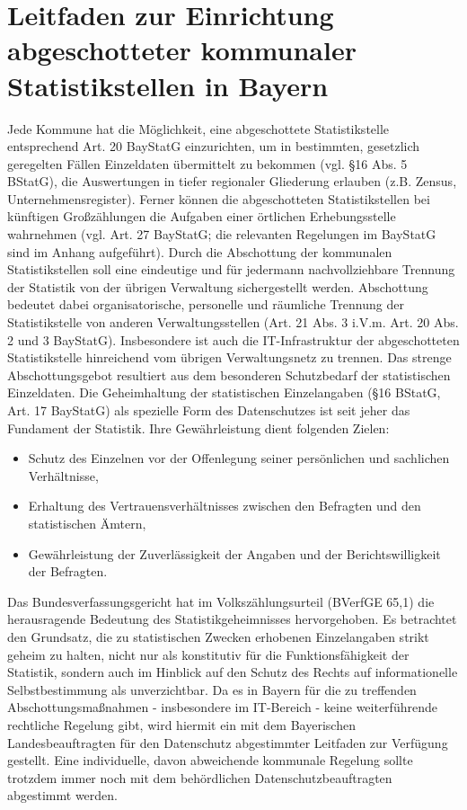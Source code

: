 \chapter[Leitfaden Abschottung]{Leitfaden zur Einrichtung abgeschotteter kommunaler Statistikstellen in Bayern}
Jede Kommune hat die Möglichkeit, eine abgeschottete Statistikstelle entsprechend Art. 20 BayStatG einzurichten, um in bestimmten, gesetzlich geregelten Fällen Einzeldaten übermittelt zu bekommen (vgl. \S 16 Abs. 5 BStatG), die Auswertungen in tiefer regionaler Gliederung erlauben (z.B. Zensus, Unternehmensregister). Ferner können die abgeschotteten Statistikstellen bei künftigen Großzählungen die Aufgaben einer örtlichen Erhebungsstelle wahrnehmen (vgl. Art. 27 BayStatG; die relevanten Regelungen im BayStatG sind im Anhang aufgeführt). Durch die Abschottung der kommunalen Statistikstellen soll eine eindeutige und für jedermann nachvollziehbare Trennung der Statistik von der übrigen Verwaltung sichergestellt werden. Abschottung bedeutet dabei organisatorische, personelle und räumliche Trennung der Statistikstelle von anderen Verwaltungsstellen (Art. 21 Abs. 3 i.V.m. Art. 20 Abs. 2 und 3 BayStatG). Insbesondere ist auch die IT-Infrastruktur der abgeschotteten Statistikstelle hinreichend vom übrigen Verwaltungsnetz zu trennen. Das strenge Abschottungsgebot resultiert aus dem besonderen Schutzbedarf der statistischen Einzeldaten. Die Geheimhaltung der statistischen Einzelangaben (\S 16 BStatG, Art. 17 BayStatG) als spezielle Form des Datenschutzes ist seit jeher das Fundament der Statistik. Ihre Gewährleistung dient folgenden Zielen:
\begin{itemize}
    \item Schutz des Einzelnen vor der Offenlegung seiner persönlichen und sachlichen Verhältnisse,
    \item Erhaltung des Vertrauensverhältnisses zwischen den Befragten und den statistischen Ämtern,
    \item Gewährleistung der Zuverlässigkeit der Angaben und der Berichtswilligkeit der Befragten.
\end{itemize}
Das Bundesverfassungsgericht hat im Volkszählungsurteil (BVerfGE 65,1) die herausragende Bedeutung des Statistikgeheimnisses hervorgehoben. Es betrachtet den Grundsatz, die zu statistischen Zwecken erhobenen Einzelangaben strikt geheim zu halten, nicht nur als konstitutiv für die Funktionsfähigkeit der Statistik, sondern auch im Hinblick auf den Schutz des Rechts auf informationelle Selbstbestimmung als unverzichtbar.
Da es in Bayern für die zu treffenden Abschottungsmaßnahmen  - insbesondere im IT-Bereich - keine weiterführende rechtliche Regelung gibt, wird hiermit ein mit dem Bayerischen Landesbeauftragten für den Datenschutz abgestimmter Leitfaden zur Verfügung gestellt. Eine individuelle, davon abweichende kommunale Regelung sollte trotzdem immer noch mit dem behördlichen Datenschutzbeauftragten abgestimmt werden. 
